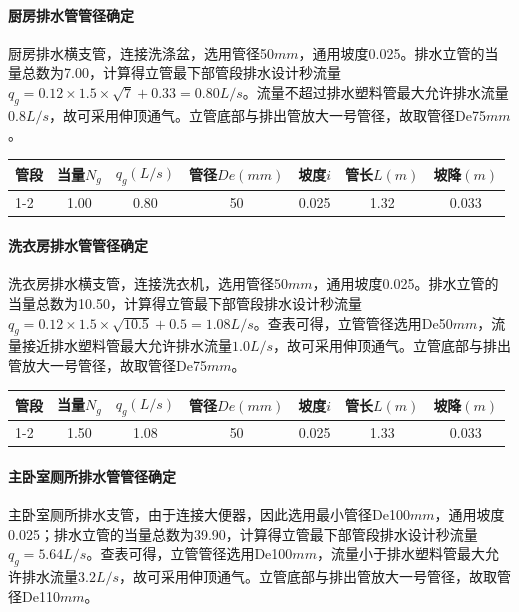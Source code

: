 \documentclass{gdutart}
\begin{document}
        \paragraph{厨房排水管管径确定}
          厨房排水横支管，连接洗涤盆，选用管径50$mm$，通用坡度0.025。排水立管的当量总数为7.00，计算得立管最下部管段排水设计秒流量$q_g = 0.12 \times 1.5 \times \sqrt{7} + 0.33 = 0.80L/s$。流量不超过排水塑料管最大允许排水流量$0.8L/s$，故可采用伸顶通气。立管底部与排出管放大一号管径，故取管径De75$mm$。
          \begin{center}
            \begin{tabularx}{\textwidth}{|Y|*{6}{c|}}
              \hline
              管段 & 当量$N_g$ & $q_g(L/s)$ & 管径$De(mm)$ & 坡度$i$ & 管长$L(m)$ & 坡降$(m)$ \bigstrut\\
              -2 & 1.00 & 0.80 & 50 & 0.025 & 1.32 & 0.033 \bigstrut \\
              \hline
            \end{tabularx}
          \end{center}

        \paragraph{洗衣房排水管管径确定}
          洗衣房排水横支管，连接洗衣机，选用管径50$mm$，通用坡度0.025。排水立管的当量总数为10.50，计算得立管最下部管段排水设计秒流量$q_g = 0.12 \times 1.5 \times \sqrt{10.5} + 0.5 = 1.08L/s$。查表可得，立管管径选用De50$mm$，流量接近排水塑料管最大允许排水流量$1.0L/s$，故可采用伸顶通气。立管底部与排出管放大一号管径，故取管径De75$mm$。
          \begin{center}
            \begin{tabularx}{\textwidth}{|Y|*{6}{c|}}
              \hline
              管段 & 当量$N_g$ & $q_g(L/s)$ & 管径$De(mm)$ & 坡度$i$ & 管长$L(m)$ & 坡降$(m)$ \bigstrut\\
              -2 & 1.50 & 1.08 & 50 & 0.025 & 1.33 & 0.033 \bigstrut \\
              \hline
            \end{tabularx}
          \end{center}

        \paragraph{主卧室厕所排水管管径确定}
          主卧室厕所排水支管，由于连接大便器，因此选用最小管径De100$mm$，通用坡度0.025；排水立管的当量总数为39.90，计算得立管最下部管段排水设计秒流量$q_g = 5.64L/s$。查表可得，立管管径选用De100$mm$，流量小于排水塑料管最大允许排水流量$3.2L/s$，故可采用伸顶通气。立管底部与排出管放大一号管径，故取管径De110$mm$。
\end{document}
